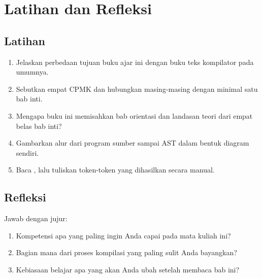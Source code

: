 \section*{Latihan dan Refleksi}

\subsection*{Latihan}
\begin{enumerate}[label=\arabic*.,leftmargin=*]
  \item Jelaskan perbedaan tujuan buku ajar ini dengan buku teks
        kompilator pada umumnya.
  \item Sebutkan empat CPMK dan hubungkan masing-masing dengan minimal
        satu bab inti.
  \item Mengapa buku ini memisahkan bab orientasi dan landasan teori
        dari empat belas bab inti?
  \item Gambarkan alur dari program sumber sampai AST dalam bentuk
        diagram sendiri.
  \item Baca , lalu tuliskan
        token-token yang dihasilkan secara manual.
\end{enumerate}

\subsection*{Refleksi}
\begin{reflectionbox}
Jawab dengan jujur:
\begin{enumerate}[label=\arabic*.,leftmargin=*]
  \item Kompetensi apa yang paling ingin Anda capai pada mata kuliah ini?
  \item Bagian mana dari proses kompilasi yang paling sulit Anda bayangkan?
  \item Kebiasaan belajar apa yang akan Anda ubah setelah membaca bab ini?
\end{enumerate}
\end{reflectionbox}
